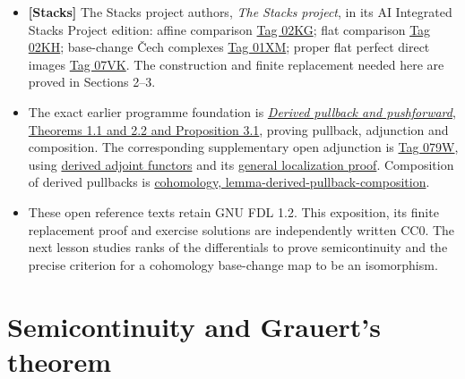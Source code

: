 \documentclass[11pt]{article}
\providecommand{\tightlist}{\setlength{\itemsep}{0pt}\setlength{\parskip}{0pt}}
\begin{document}
\begin{itemize}
\tightlist
\item
  \textbf{{[}Stacks{]}} The Stacks project authors, \emph{The Stacks
  project}, in its AI Integrated Stacks Project edition: affine
  comparison
  \href{https://kokunoyumeto.github.io/stacks-zh-hans-cn/en/coherent.html\#coherent-lemma-affine-base-change}{Tag
  02KG}; flat comparison
  \href{https://kokunoyumeto.github.io/stacks-zh-hans-cn/en/coherent.html\#coherent-lemma-flat-base-change-cohomology}{Tag
  02KH}; base-change Čech complexes
  \href{https://kokunoyumeto.github.io/stacks-zh-hans-cn/en/coherent.html\#coherent-lemma-base-change-complex}{Tag
  01XM}; proper flat perfect direct images
  \href{https://kokunoyumeto.github.io/stacks-zh-hans-cn/en/coherent.html\#coherent-lemma-perfect-direct-image}{Tag
  07VK}. The construction and finite replacement needed here are proved
  in Sections 2--3.
\item
  The exact earlier programme foundation is
  \href{../derived-categories-and-sheaf-operations/derived-pullback-and-pushforward.html}{\emph{Derived
  pullback and pushforward}, Theorems 1.1 and 2.2 and Proposition 3.1},
  proving pullback, adjunction and composition. The corresponding
  supplementary open adjunction is
  \href{https://kokunoyumeto.github.io/stacks-zh-hans-cn/en/cohomology.html\#cohomology-lemma-adjoint}{Tag
  079W}, using
  \href{https://kokunoyumeto.github.io/stacks-zh-hans-cn/en/derived.html\#derived-lemma-derived-adjoint-functors}{derived
  adjoint functors} and its
  \href{https://kokunoyumeto.github.io/stacks-zh-hans-cn/en/derived.html\#derived-lemma-pre-derived-adjoint-functors-general}{general
  localization proof}. Composition of derived pullbacks is
  \href{https://kokunoyumeto.github.io/stacks-zh-hans-cn/en/cohomology.html\#cohomology-lemma-derived-pullback-composition}{cohomology,
  lemma-derived-pullback-composition}.
\item
  These open reference texts retain GNU FDL 1.2. This exposition, its
  finite replacement proof and exercise solutions are independently
  written CC0. The next lesson studies ranks of the differentials to
  prove semicontinuity and the precise criterion for a cohomology
  base-change map to be an isomorphism.
\end{itemize}

\section{Semicontinuity and Grauert's
theorem}\label{semicontinuity-and-grauerts-theorem}
\end{document}
